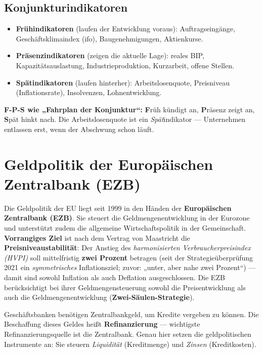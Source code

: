 \documentclass[11pt, a4paper]{article}
\begin{document}
\subsection{Konjunkturindikatoren}

\begin{itemize}
  \item \textbf{Frühindikatoren} (laufen der Entwicklung voraus): Auftragseingänge,
    Geschäftsklimaindex (ifo), Baugenehmigungen, Aktienkurse.
  \item \textbf{Präsenzindikatoren} (zeigen die aktuelle Lage): reales BIP,
    Kapazitätsauslastung, Industrieproduktion, Kurzarbeit, offene Stellen.
  \item \textbf{Spätindikatoren} (laufen hinterher): Arbeitslosenquote, Preisniveau
    (Inflationsrate), Insolvenzen, Lohnentwicklung.
\end{itemize}

\begin{eselsbruecke}
\textbf{F-P-S wie „Fahrplan der Konjunktur``:} \textbf{F}rüh kündigt an,
\textbf{P}räsenz zeigt an, \textbf{S}pät hinkt nach. Die Arbeitslosenquote ist ein
\emph{Spät}indikator --- Unternehmen entlassen erst, wenn der Abschwung schon läuft.
\end{eselsbruecke}

\section{Geldpolitik der Europäischen Zentralbank (EZB)}

Die Geldpolitik der EU liegt seit 1999 in den Händen der \textbf{Europäischen
Zentralbank (EZB)}. Sie steuert die Geldmengenentwicklung in der Eurozone und unterstützt
zudem die allgemeine Wirtschaftspolitik in der Gemeinschaft. \textbf{Vorrangiges Ziel}
ist nach dem Vertrag von Maastricht die \textbf{Preisniveaustabilität}: Der Anstieg des
\emph{harmonisierten Verbraucherpreisindex (HVPI)} soll mittelfristig \textbf{zwei
Prozent} betragen (seit der Strategieüberprüfung 2021 ein \emph{symmetrisches}
Inflationsziel; zuvor: „unter, aber nahe zwei Prozent``) --- damit sind sowohl Inflation
als auch Deflation ausgeschlossen. Die EZB
berücksichtigt bei ihrer Geldmengensteuerung sowohl die Preisentwicklung als auch die
Geldmengenentwicklung (\textbf{Zwei-Säulen-Strategie}).

\begin{merksatz}
Geschäftsbanken benötigen Zentralbankgeld, um Kredite vergeben zu können. Die Beschaffung
dieses Geldes heißt \textbf{Refinanzierung} --- wichtigste Refinanzierungsquelle ist die
Zentralbank. Genau hier setzen die geldpolitischen Instrumente an: Sie steuern
\emph{Liquidität} (Kreditmenge) und \emph{Zinsen} (Kreditkosten).
\end{merksatz}
\end{document}
